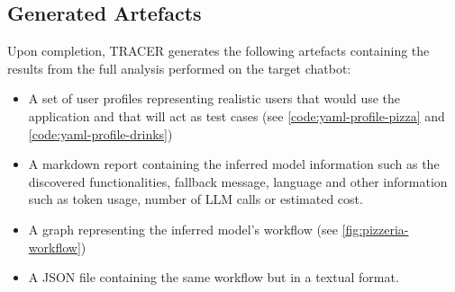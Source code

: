 \subsection{Generated Artefacts}

Upon completion, \ac{TRACER} generates the following artefacts
containing the results from the full analysis performed on the target chatbot:

\begin{itemize}
  \item A set of user profiles
    representing realistic users that would use the application
    and that will act as test cases
    (see \autoref{code:yaml-profile-pizza} and \autoref{code:yaml-profile-drinks})
  \item A markdown report containing the inferred model information such as
    the discovered functionalities, fallback message, language
    and other information such as token usage,
    number of \ac{LLM} calls or estimated cost.
  \item A graph representing the inferred model's workflow (see \autoref{fig:pizzeria-workflow})
  \item A JSON file containing the same workflow but in a textual format.
\end{itemize}

